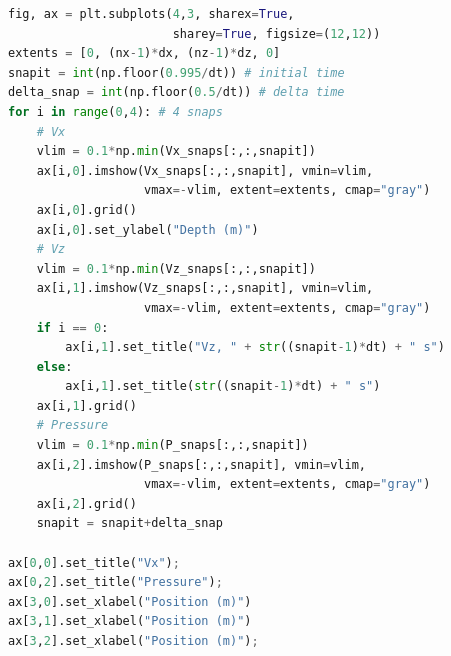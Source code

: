 \documentclass[a4paper , 12pt]{book}
\begin{document}
\begin{center}
\begin{lstlisting}[language=Python, frame=single]
fig, ax = plt.subplots(4,3, sharex=True, 
                       sharey=True, figsize=(12,12))
extents = [0, (nx-1)*dx, (nz-1)*dz, 0]
snapit = int(np.floor(0.995/dt)) # initial time
delta_snap = int(np.floor(0.5/dt)) # delta time
for i in range(0,4): # 4 snaps
    # Vx
    vlim = 0.1*np.min(Vx_snaps[:,:,snapit])
    ax[i,0].imshow(Vx_snaps[:,:,snapit], vmin=vlim, 
                   vmax=-vlim, extent=extents, cmap="gray")
    ax[i,0].grid()
    ax[i,0].set_ylabel("Depth (m)")
    # Vz
    vlim = 0.1*np.min(Vz_snaps[:,:,snapit])
    ax[i,1].imshow(Vz_snaps[:,:,snapit], vmin=vlim, 
                   vmax=-vlim, extent=extents, cmap="gray")
    if i == 0:
        ax[i,1].set_title("Vz, " + str((snapit-1)*dt) + " s")
    else:
        ax[i,1].set_title(str((snapit-1)*dt) + " s")
    ax[i,1].grid()
    # Pressure
    vlim = 0.1*np.min(P_snaps[:,:,snapit])
    ax[i,2].imshow(P_snaps[:,:,snapit], vmin=vlim, 
                   vmax=-vlim, extent=extents, cmap="gray")
    ax[i,2].grid()
    snapit = snapit+delta_snap

ax[0,0].set_title("Vx");
ax[0,2].set_title("Pressure");
ax[3,0].set_xlabel("Position (m)")
ax[3,1].set_xlabel("Position (m)")
ax[3,2].set_xlabel("Position (m)");
\end{lstlisting}
\end{center}
\end{document}
